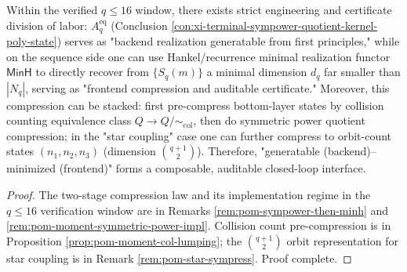 \begin{conclusion}[Two-stage executable compression: \texorpdfstring{$\text{direct product}\Rightarrow A^{\mathrm{eq}}_q\Rightarrow \mathsf{MinH}(S_q)$}{product=>Aeq=>MinH} yields "backend-generatable--frontend minimal certificate" dual track closed loop]\label{con:xi-terminal-two-stage-compression-sympower-minh}
Within the verified \(q\le 16\) window, there exists strict engineering and certificate division of labor:
\(A^{\mathrm{eq}}_q\) (Conclusion \ref{con:xi-terminal-sympower-quotient-kernel-poly-state}) serves as "backend realization generatable from first principles," while on the sequence side one can use Hankel/recurrence minimal realization functor \(\mathsf{MinH}\) to directly recover from \(\{S_q(m)\}\) a minimal dimension \(d_q\) far smaller than \(|N_q|\), serving as "frontend compression and auditable certificate."
Moreover, this compression can be stacked: first pre-compress bottom-layer states by collision counting equivalence class \(Q\to Q/{\sim_{\mathrm{col}}}\), then do symmetric power quotient compression; in the "star coupling" case one can further compress to orbit-count states \((n_1,n_2,n_3)\) (dimension \(\binom{q+1}{2}\)).
Therefore, "generatable (backend)--minimized (frontend)" forms a composable, auditable closed-loop interface.
\end{conclusion}
\begin{proof}[Proof]
The two-stage compression law and its implementation regime in the \(q\le 16\) verification window are in Remarks \ref{rem:pom-sympower-then-minh} and \ref{rem:pom-moment-symmetric-power-impl}.
Collision count pre-compression is in Proposition \ref{prop:pom-moment-col-lumping}; the \(\binom{q+1}{2}\) orbit representation for star coupling is in Remark \ref{rem:pom-star-sympress}. Proof complete.
\end{proof}

